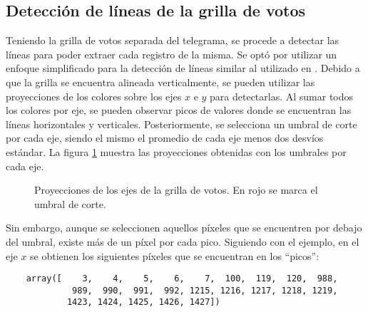 \subsection{Detección de líneas de la grilla de votos}
Teniendo la grilla de votos separada del telegrama, se procede a detectar las líneas para poder extraer cada registro
de la misma. Se optó por utilizar un enfoque simplificado para la detección de líneas similar al utilizado en \parencite{lamagna2016lectura}. Debido a que la grilla se encuentra alineada verticalmente, se pueden utilizar las
proyecciones de los colores sobre los ejes $x$ e $y$ para detectarlas. Al sumar todos los colores por eje, se pueden
observar picos de valores donde se encuentran las líneas horizontales y verticales. Posteriormente, se selecciona un
umbral de corte por cada eje, siendo el mismo el promedio de cada eje menos dos desvíos estándar. La figura
\ref{fig:etl-3-proyecciones} muestra las proyecciones obtenidas con los umbrales por cada eje.

\begin{figure}[H]
    \centering



    \caption[Proyecciones de los ejes de la grilla de votos]{Proyecciones de los ejes de la grilla de votos. En rojo se marca el umbral de corte.}
    \label{fig:etl-3-proyecciones}
\end{figure}

Sin embargo, aunque se seleccionen aquellos píxeles que se encuentren por debajo del umbral, existe más de un píxel por
cada pico. Siguiendo con el ejemplo, en el eje $x$ se obtienen los siguientes píxeles que se encuentran en los
``picos'':

\begin{verbatim}
    array([    3,    4,    5,    6,    7,  100,  119,  120,  988, 
             989,  990,  991,  992, 1215, 1216, 1217, 1218, 1219, 
            1423, 1424, 1425, 1426, 1427])
\end{verbatim}

